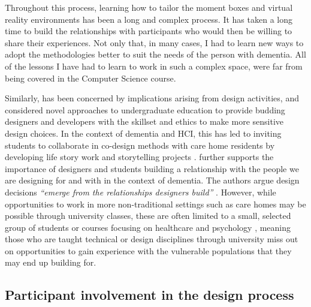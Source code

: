 Throughout this process, learning how to tailor the moment boxes and virtual reality environments has been a long and complex process. It has taken a long time to build the relationships with participants who would then be willing to share their experiences. Not only that, in many cases, I had to learn new ways to adopt the methodologies better to suit the needs of the person with dementia. All of the lessons I have had to learn to work in such a complex space, were far from being covered in the Computer Science course.

Similarly, \cite{hendriks_valuing_2018} has been concerned by implications arising from design activities, and considered novel approaches to undergraduate education to provide budding designers and developers with the skillset and ethics to make more sensitive design choices. In the context of dementia and HCI, this has led to inviting students to collaborate in co-design methods with care home residents by developing life story work \citep{mckeown2015you} and storytelling projects \citep{hyden2013storytelling}. \cite{hendriks_valuing_2018} further supports the importance of designers and students building a relationship with the people we are designing for and with in the context of dementia. The authors argue design decisions \textit{``emerge from the relationships designers build''} \citep[pg. 3]{hendriks_valuing_2018}. However, while opportunities to work in more non-traditional settings such as care homes may be possible through university classes, these are often limited to a small, selected group of students or courses focusing on healthcare and psychology \citep{kinnunen_understanding_2018}, meaning those who are taught technical or design disciplines through university miss out on opportunities to gain experience with the vulnerable populations that they may end up building for. 

\subsection{Participant involvement in the design process}
\label{extent-co-design}

